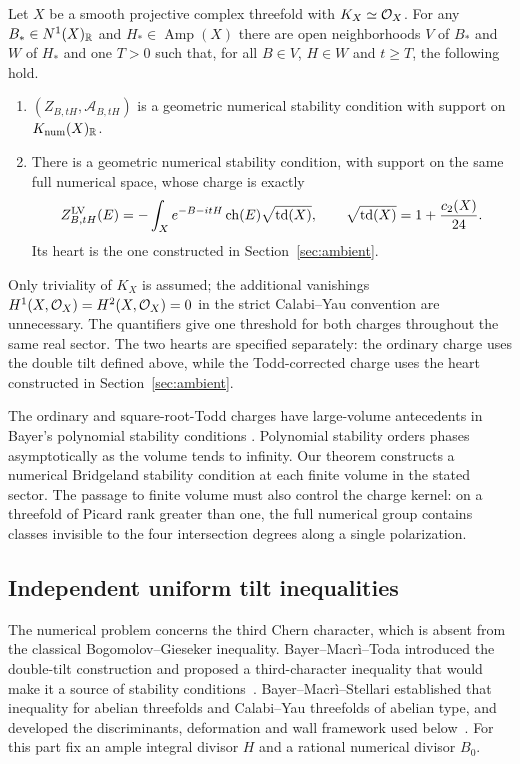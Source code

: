 \begin{theorem}
\label{thm:geometric-sector}
Let $X$ be a smooth projective complex threefold with
$K_X\simeq\mathcal O_X$. For any $B_*\in N^1(X)_{\mathbb R}$ and
$H_*\in\operatorname{Amp}(X)$ there are open neighborhoods $V$ of
$B_*$ and $W$ of $H_*$ and one $T>0$ such that, for all
$B\in V$, $H\in W$ and $t\geq T$, the following hold.
\begin{enumerate}[label=\textup{(\roman*)}]
\item $(Z_{B,tH},\mathcal A_{B,tH})$ is a geometric numerical
stability condition with support on $K_{\mathrm{num}}(X)_{\mathbb R}$.
\item There is a geometric numerical stability condition, with support
on the same full numerical space, whose charge is exactly
\[
 Z^{\mathrm{LV}}_{B,tH}(E)
 =-\int_Xe^{-B-itH}\operatorname{ch}(E)\sqrt{\operatorname{td}(X)},
 \qquad \sqrt{\operatorname{td}(X)}=1+\frac{c_2(X)}{24}.
\]
Its heart is the one constructed in Section~\ref{sec:ambient}.
\end{enumerate}
\end{theorem}

Only triviality of $K_X$ is assumed; the additional vanishings
$H^1(X,\mathcal O_X)=H^2(X,\mathcal O_X)=0$ in the strict Calabi--Yau convention
are unnecessary. The quantifiers give one threshold for both charges
throughout the same real sector. The two hearts are specified separately:
the ordinary charge uses the double tilt defined above, while the
Todd-corrected charge uses the heart constructed in
Section~\ref{sec:ambient}.

The ordinary and square-root-Todd charges have large-volume antecedents in
Bayer's polynomial stability conditions
\cite[Theorem~3.2.2 and Section~4]{BayerPolynomial2009}. Polynomial stability
orders phases asymptotically as the volume tends to infinity. Our theorem
constructs a numerical Bridgeland stability condition at each finite
volume in the stated sector. The passage to finite volume must also
control the charge kernel: on a threefold of Picard rank greater than
one, the full numerical group contains classes invisible to the four
intersection degrees along a single polarization.

\subsection{Independent uniform tilt inequalities}

The numerical problem concerns the third Chern character, which is absent
from the classical Bogomolov--Gieseker inequality. Bayer--Macr\`i--Toda
introduced the double-tilt construction and proposed a third-character
inequality that would make it a source of stability
conditions~\cite{BMT2014}. Bayer--Macr\`i--Stellari established that
inequality for abelian threefolds and Calabi--Yau threefolds of abelian
type, and developed the discriminants, deformation and wall framework used
below~\cite{BMS2016}. For this part fix an ample integral divisor $H$
and a rational numerical divisor $B_0$.

